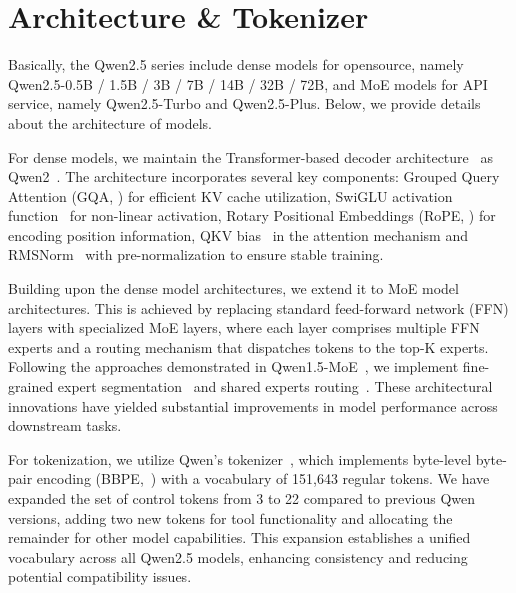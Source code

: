\documentclass{article}
\begin{document}
\section{Architecture \& Tokenizer}

Basically, the Qwen2.5 series include dense models for opensource, namely Qwen2.5-0.5B / 1.5B / 3B / 7B / 14B / 32B / 72B, and MoE models for API service, namely Qwen2.5-Turbo and Qwen2.5-Plus. Below, we provide details about the architecture of models.

For dense models, we maintain the Transformer-based decoder architecture~\citep{transformer,gpt} as Qwen2~\citep{qwen2}. The architecture incorporates several key components: Grouped Query Attention (GQA, \citealp{gqa}) for efficient KV cache utilization, SwiGLU activation function~\citep{glu} for non-linear activation, Rotary Positional Embeddings (RoPE, \citealp{rope}) for encoding position information, QKV bias~\citep{qkv_bias} in the attention mechanism and RMSNorm~\citep{rmsnorm} with pre-normalization to ensure stable training.

Building upon the dense model architectures, we extend it to MoE model architectures. This is achieved by replacing standard feed-forward network (FFN) layers with specialized MoE layers, where each layer comprises multiple FFN experts and a routing mechanism that dispatches tokens to the top-K experts. Following the approaches demonstrated in Qwen1.5-MoE~\citep{qwen2}, we implement fine-grained expert segmentation~\citep{deepseekmoe} and shared experts routing~\citep{deepspeedmoe, deepseekmoe}. These architectural innovations have yielded substantial improvements in model performance across downstream tasks.

For tokenization, we utilize Qwen's tokenizer~\citep{qwen}, which implements byte-level byte-pair encoding (BBPE,~\citealp{gpt3,wang2020neural,sennirch2016neural}) with a vocabulary of 151,643 regular tokens. We have expanded the set of control tokens from 3 to 22 compared to previous Qwen versions, adding two new tokens for tool functionality and allocating the remainder for other model capabilities. This expansion establishes a unified vocabulary across all Qwen2.5 models, enhancing consistency and reducing potential compatibility issues.
\end{document}
